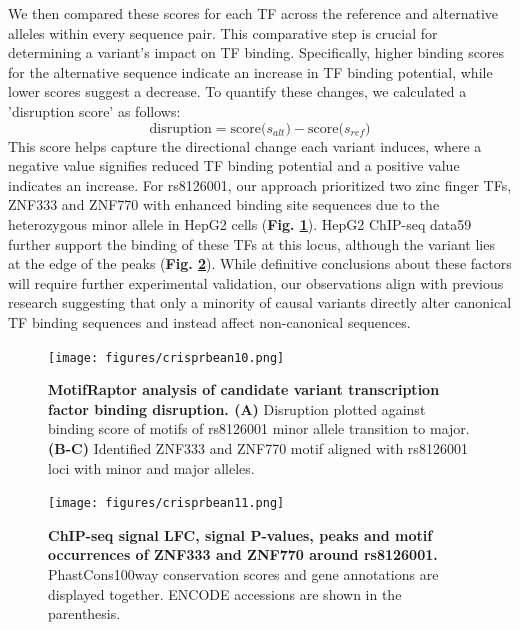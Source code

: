 \documentclass[a4paper, titlepage, openright]{book}
\begin{document}
We then compared these scores for each TF across the reference and alternative alleles within every sequence pair. This comparative step is crucial for determining a variant's impact on TF binding. Specifically, higher binding scores for the alternative sequence indicate an increase in TF binding potential, while lower scores suggest a decrease. To quantify these changes, we calculated a 'disruption score' as follows: 
\[
\text{disruption} = \textrm{score($s_{alt}$)}- \textrm{score($s_{ref}$)}
\]
This score helps capture the directional change each variant induces, where a negative value signifies reduced TF binding potential and a positive value indicates an increase. For rs8126001, our approach prioritized two zinc finger TFs, ZNF333 and ZNF770 with enhanced binding site sequences due to the heterozygous minor allele in HepG2 cells (\textbf{Fig. \ref{fig:crisprbean10}}). HepG2 ChIP-seq data59 further support the binding of these TFs at this locus, although the variant lies at the edge of the peaks (\textbf{Fig. \ref{fig:crisprbean11}}). While definitive conclusions about these factors will require further experimental validation, our observations align with previous research \citep{farh2015genetic} suggesting that only a minority of causal variants directly alter canonical TF binding sequences and instead affect non-canonical sequences. 
\begin{figure}
	\centering
	\texttt{[image: figures/crisprbean10.png]}
	\caption[MotifRaptor analysis of candidate variant transcription factor binding disruption]{\textbf{MotifRaptor analysis of candidate variant transcription factor binding disruption.  (A)} Disruption plotted against binding score of motifs of rs8126001 minor allele transition to major. \textbf{(B-C)} Identified ZNF333 and ZNF770 motif aligned with rs8126001 loci with minor and major alleles.}
	\label{fig:crisprbean10}
\end{figure} 
\begin{figure}
	\centering
	\texttt{[image: figures/crisprbean11.png]}
	\caption[ChIP-seq signal LFC, signal P-values, peaks and motif occurrences of ZNF333 and ZNF770 around rs8126001]{\textbf{ChIP-seq signal LFC, signal P-values, peaks and motif occurrences of ZNF333 and ZNF770 around rs8126001.} PhastCons100way conservation scores and gene annotations are  displayed together. ENCODE accessions are shown in the parenthesis. }
	\label{fig:crisprbean11}
\end{figure} 
\end{document}
